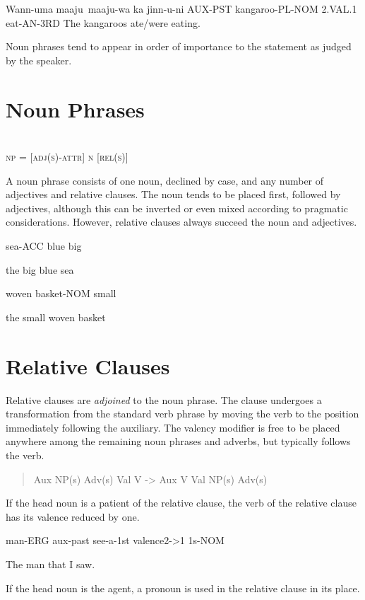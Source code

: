 Wann-uma maaju~maaju-wa ka jinn-u-ni
AUX-PST kangaroo-PL-NOM  2.VAL.1  eat-AN-3RD
The kangaroos ate/were eating.

Noun phrases tend to appear in order of importance to the statement as judged by
the speaker.

\section{Noun Phrases}

\begin{definition}
~\\
\textsc{np = [adj(s)-attr] n [rel(s)]}
\end{definition}

A noun phrase consists of one noun, declined by case, and any number of
adjectives and relative clauses. The noun tends to be placed first, followed by
adjectives, although this can be inverted or even mixed according to pragmatic
considerations. However, relative clauses always succeed the noun and
adjectives.

sea-ACC blue big

the big blue sea

woven basket-NOM small

the small woven basket

\section{Relative Clauses}

Relative clauses are \textit{adjoined} to the noun phrase. The clause undergoes
a transformation from the standard verb phrase by moving the verb to the
position immediately following the auxiliary. The valency modifier is free to be
placed anywhere among the remaining noun phrases and adverbs, but typically
follows the verb.

\begin{quote}

Aux NP(s) Adv(s) Val V -> Aux V Val NP(s) Adv(s)

\end{quote}

If the head noun is a patient of the relative clause, the verb of the relative
clause has its valence reduced by one.

man-ERG aux-past see-a-1st valence2->1 1s-NOM

The man that I saw.

If the head noun is the agent, a pronoun is used in the relative clause in its
place.


